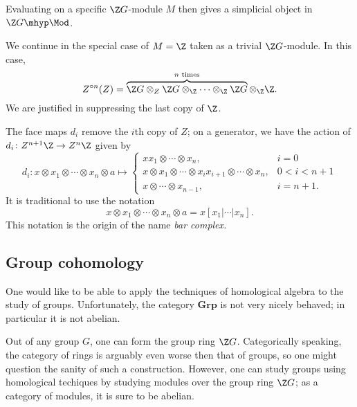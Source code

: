 \documentclass[main.tex]{subfiles}
\begin{document}
\begin{example}
  Evaluating on a specific $\Z G$-module $M$ then gives a simplicial object in $\Z G\mhyp\Mod$.

  We continue in the special case of $M = \Z$ taken as a trivial $\Z G$-module. In this case,
  \begin{equation*}
    Z^{\circ  n}(Z) = \overbrace{\Z G \otimes_{Z} \Z G \otimes_{\Z} \cdots \otimes_{\Z} \Z G}^{n \text{ times}} \otimes_{\Z} \Z.
  \end{equation*}
  We are justified in suppressing the last copy of $\Z$.

  The face maps $d_{i}$ remove the $i$th copy of $Z$; on a generator, we have the action of $d_{i}\colon Z^{n+1}\Z \to Z^{n}\Z$ given by
  \begin{equation*}
    d_{i}\colon x \otimes x_{1} \otimes \cdots \otimes x_{n} \otimes a \mapsto
    \begin{cases}
      x x_{1} \otimes \cdots \otimes x_{n}, &i = 0 \\
      x \otimes x_{1} \otimes \cdots \otimes x_{i}x_{i+1} \otimes \cdots \otimes x_{n},& 0 < i < n+1 \\
      x \otimes \cdots \otimes x_{n-1}, &i = n+1.
    \end{cases}
  \end{equation*}
  It is traditional to use the notation
  \begin{equation*}
    x \otimes x_{1} \otimes \cdots \otimes x_{n} \otimes a = x[x_{1}| \cdots | x_{n}].
  \end{equation*}
  This notation is the origin of the name \emph{bar complex.}
\end{example}

\subsection{Group cohomology}
\label{ssc:group_cohomology}

One would like to be able to apply the techniques of homological algebra to the study of groups. Unfortunately, the category $\mathbf{Grp}$ is not very nicely behaved; in particular it is not abelian.

Out of any group $G$, one can form the group ring $\Z G$. Categorically speaking, the category of rings is arguably even worse then that of groups, so one might question the sanity of such a construction. However, one can study groups using homological techiques by studying modules over the group ring $\Z G$; as a category of modules, it is sure to be abelian.
\end{document}
